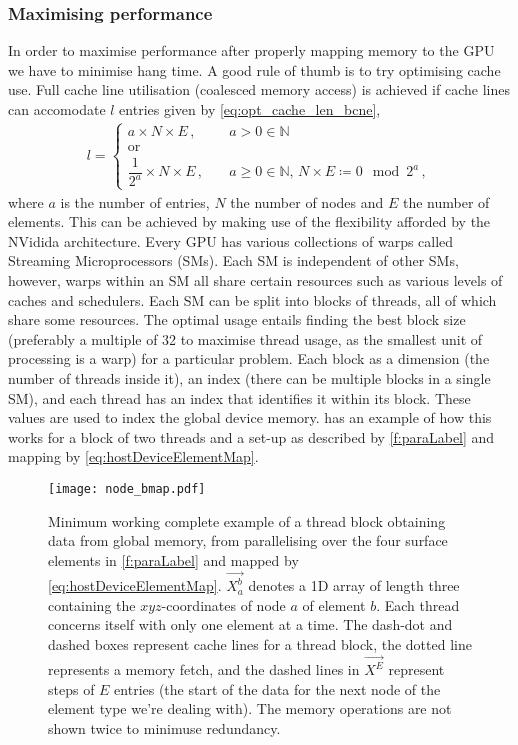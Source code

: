 \subsubsection{Maximising performance}

In order to maximise performance after properly mapping memory to the GPU we have to minimise hang time. A good rule of thumb is to try optimising cache use. Full cache line utilisation (coalesced memory access) is achieved if cache lines can accomodate $ l $ entries given by \cref{eq:opt_cache_len_bcne},
\begin{align}
  \label{eq:opt_cache_len_bcne}
  l =
  \begin{cases}
    a \times N \times E\,,                & \quad a > 0 \in \mathbb{N}                                             \\
    \textrm{or}                                                                                                    \\
    \dfrac{1}{2^{a}} \times N \times E\,, & \quad a \geq 0 \in \mathbb{N},\, N \times E \coloneqq 0 \mod{2^{a}}\,,
  \end{cases}
\end{align}
where $a$ is the number of entries, $N$ the number of nodes and $E$ the number of elements. This can be achieved by making use of the flexibility afforded by the NVidida architecture. Every GPU has various collections of warps called Streaming Microprocessors (SMs). Each SM is independent of other SMs, however, warps within an SM all share certain resources such as various levels of caches and schedulers. Each SM can be split into blocks of threads, all of which share some resources. The optimal usage entails finding the best block size (preferably a multiple of 32 to maximise thread usage, as the smallest unit of processing is a warp) for a particular problem. Each block as a dimension (the number of threads inside it), an index (there can be multiple blocks in a single SM), and each thread has an index that identifies it within its block. These values are used to index the global device memory.  has an example of how this works for a block of two threads and a set-up as described by \cref{f:paraLabel} and mapping by \cref{eq:hostDeviceElementMap}.
\begin{figure}
  \centering
  \texttt{[image: node\_bmap.pdf]}
  \caption[Sample parallel execution.]{Minimum working complete example of a thread block obtaining data from global memory, from parallelising over the four surface elements in \cref{f:paraLabel} and mapped by \cref{eq:hostDeviceElementMap}. $\vec{X_{a}^{b}}$ denotes a 1D array of length three containing the $ xyz $-coordinates of node $ a $ of element $ b $. Each thread concerns itself with only one element at a time. The dash-dot and dashed boxes represent cache lines for a thread block, the dotted line represents a memory fetch, and the dashed lines in $ \vec{X^{E}} $ represent steps of $ E $ entries (the start of the data for the next node of the element type we're dealing with). The memory operations are not shown twice to minimuse redundancy.}
  \label{f:parallel_exec}
\end{figure}

